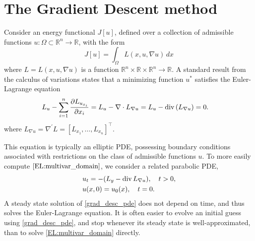 \label{lab:tv_images}




\section*{The Gradient Descent method}
Consider an energy functional $J[u]$, defined over a collection of admissible functions $u:\Omega \subset \mathbb{R}^n \to \mathbb{R}$, with the form
\[J[u] = \int_{\Omega} L(x,u,\nabla u) \, dx\]
where $L = L(x,u,\nabla u)$ is a function $\mathbb{R}^n \times \mathbb{R} \times \mathbb{R}^n \to \mathbb{R}$.
A standard result from the calculus of variations states that a minimizing function $u^*$ satisfies the Euler-Lagrange equation
\begin{align}
L_u-\sum_{i=1}^n\frac{\partial L_{u_{x_i}}}{\partial x_i}=L_u-\nabla\cdot L_{\nabla u}=L_u - {\rm div}\,(L_{\nabla u}) &= 0.    \label{EL:multivar_domain}
\end{align}
where $L_{\nabla u} = \nabla^\prime L = [L_{x_1},\hdots,L_{x_n}]^\intercal$.

This equation is typically an elliptic PDE, possessing boundary conditions associated with  restrictions on the class of admissible functions $u$.
To more easily compute $\eqref{EL:multivar_domain}$, we consider a related parabolic PDE,
\begin{align}
    \begin{split}
    &{ } u_t = -(L_y - {\rm div}\, L_{\nabla u}), \quad t > 0,\\
    &{ } u(x,0) = u_0(x), \quad t = 0.
    \end{split} \label{grad_desc_pde}
\end{align}
A steady state solution of \eqref{grad_desc_pde} does not depend on time, and thus solves the Euler-Lagrange equation.
It is often easier to evolve an initial guess using \eqref{grad_desc_pde}, and stop whenever its steady state is well-approximated, than to solve \eqref{EL:multivar_domain} directly.


